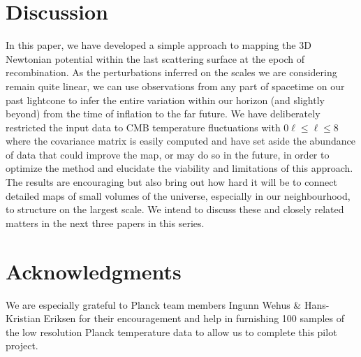 \documentclass[useAMS,usenatbib,a4paper]{mn2e}
\begin{document}
\section{Discussion}
In this paper, we have developed a simple approach to mapping the 3D Newtonian potential within  the last scattering surface at the epoch of recombination. As the perturbations inferred on the scales we are considering remain quite linear, we can use observations from any part of spacetime on our past lightcone to infer the entire variation within our horizon (and slightly beyond) from the time of inflation to the far future. We have deliberately restricted the input data to CMB temperature fluctuations with $0\ell\leq\ell\leq8$ where the covariance matrix is easily computed and have set aside the abundance of data that could improve the map, or may do so in the future, in order to optimize the method and elucidate the viability and limitations of this approach. The results are encouraging but also bring out how hard it will be to connect detailed maps of small volumes of the universe, especially in our neighbourhood, to structure on the largest scale. We intend to discuss these and closely related matters in the next three papers in this series.
\section*{Acknowledgments}
We are especially grateful to Planck team members Ingunn Wehus \& Hans-Kristian Eriksen for their encouragement and help in furnishing 100 samples of the low resolution Planck temperature data to allow us to complete this pilot project. 


\end{document}
